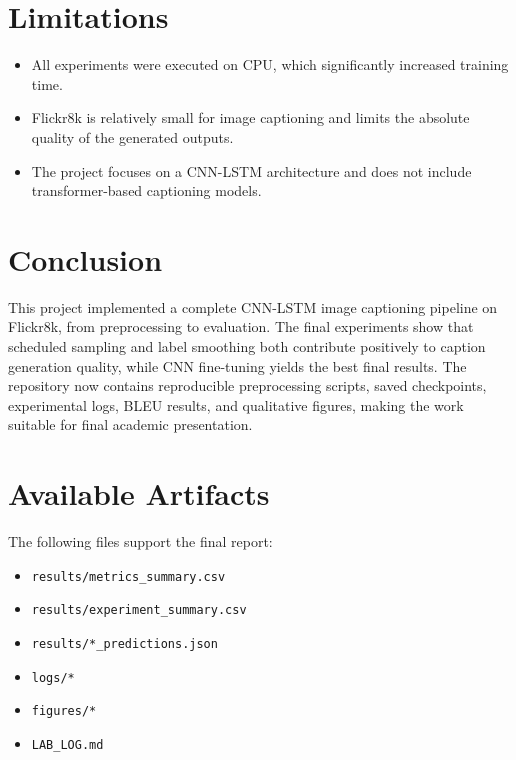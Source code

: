 \documentclass[11pt,a4paper]{article}
\begin{document}
\section{Limitations}

\begin{itemize}[leftmargin=*]
    \item All experiments were executed on CPU, which significantly increased training time.
    \item Flickr8k is relatively small for image captioning and limits the absolute quality of the generated outputs.
    \item The project focuses on a CNN-LSTM architecture and does not include transformer-based captioning models.
\end{itemize}

\section{Conclusion}

This project implemented a complete CNN-LSTM image captioning pipeline on Flickr8k, from preprocessing to evaluation. The final experiments show that scheduled sampling and label smoothing both contribute positively to caption generation quality, while CNN fine-tuning yields the best final results. The repository now contains reproducible preprocessing scripts, saved checkpoints, experimental logs, BLEU results, and qualitative figures, making the work suitable for final academic presentation.

\section*{Available Artifacts}

The following files support the final report:
\begin{itemize}[leftmargin=*]
    \item \texttt{results/metrics\_summary.csv}
    \item \texttt{results/experiment\_summary.csv}
    \item \texttt{results/*\_predictions.json}
    \item \texttt{logs/*}
    \item \texttt{figures/*}
    \item \texttt{LAB\_LOG.md}
\end{itemize}
\end{document}
